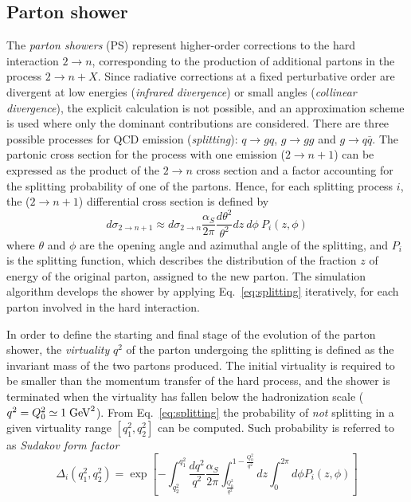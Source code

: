\subsection{Parton shower}
\label{sec:partonshower}

The {\it parton showers} (PS) represent higher-order corrections to the hard
interaction $2\to n$, corresponding to the production of additional
partons in the process $2\to n+X$.
Since radiative corrections at a fixed perturbative order are
divergent at low energies ({\it infrared divergence}) or small angles
({\it collinear divergence}), the explicit calculation is not possible,
and an approximation scheme is used where only the dominant
contributions are considered.
There are three possible processes for QCD emission ({\it splitting}): 
$q\to gq$, $g\to gg$ and $g\to q\bar{q}$.
The partonic cross section for the process with one emission ($2\to
n+1$) can be expressed as the product of the $2\to n$ cross section
and a factor accounting for the splitting probability of one of the
partons. 
Hence, for each splitting process $i$, the ($2\to n+1$) differential
cross section is defined by
\begin{equation}
  d\sigma_{2\to n+1}\approx{} d\sigma_{2\to n}
  \frac{\alpha_S}{2\pi}\frac{d\theta^2}{\theta^2} dz~d\phi~P_i(z,\phi) 
 \label{eq:splitting}
\end{equation}
where $\theta$ and $\phi$ are the opening angle and azimuthal angle of
the splitting, and $P_i$ is the splitting function, which describes
the distribution of the fraction $z$ of energy of the original parton,
assigned to the new parton.
The simulation algorithm develops the shower by applying
Eq.~\ref{eq:splitting} iteratively, for each parton involved in the
hard interaction.

In order to define the starting and final stage of the evolution of
the parton shower, the {\it virtuality} $q^2$ of the parton undergoing
the splitting is defined as the invariant mass of the two partons
produced. The initial virtuality is required to be smaller than the
momentum transfer of the hard process, and the shower is terminated
when the virtuality has fallen below the hadronization scale
($q^2=Q_0^2\simeq1\; \mathrm{GeV}^2$).
From Eq.~\ref{eq:splitting} the probability of {\it not} splitting in
a given virtuality range $[q_1^2,q_2^2]$ can be computed. Such
probability is referred to as {\it Sudakov form factor}
\begin{equation}
  \label{eq:sudakov} 
  \Delta_i (q_1^2, q_2^2) = \exp \left[ - \int_{q_2^2}^{q_1^2}
    \frac{dq^2}{q^2} \frac{\alpha_S}{2\pi}
    \int_{\frac{Q_0^2}{q^2}}^{1-\frac{Q_0^2}{q^2}} dz \int_0^{2\pi} d\phi{} P_{i} (z,\phi) \right]
  \end{equation}

